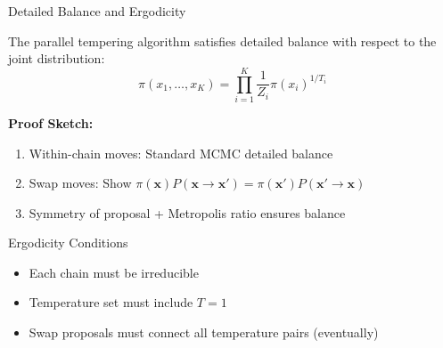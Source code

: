 \documentclass[aspectratio=169]{beamer}
\begin{document}
\begin{frame}{Detailed Balance and Ergodicity}
	\begin{proposition}
		The parallel tempering algorithm satisfies detailed balance with respect to the joint distribution:
		$$\pi(x_1, \ldots, x_K) = \prod_{i=1}^K \frac{1}{Z_i} \pi(x_i)^{1/T_i}$$
	\end{proposition}

	\textbf{Proof Sketch:}
	\begin{enumerate}
		\item Within-chain moves: Standard MCMC detailed balance
		\item Swap moves: Show $\pi(\mathbf{x}) P(\mathbf{x} \to \mathbf{x}') = \pi(\mathbf{x}') P(\mathbf{x}' \to \mathbf{x})$
		\item Symmetry of proposal + Metropolis ratio ensures balance
	\end{enumerate}

	\begin{block}{Ergodicity Conditions}
		\begin{itemize}
			\item Each chain must be irreducible
			\item Temperature set must include $T = 1$
			\item Swap proposals must connect all temperature pairs (eventually)
		\end{itemize}
	\end{block}
\end{frame}
\end{document}
